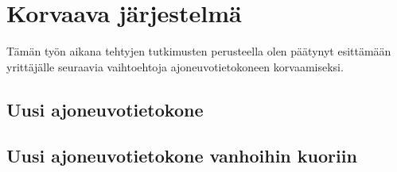 \chapter{Korvaava järjestelmä}
\label{ch:korvaava_jarjestelma}

Tämän työn aikana tehtyjen tutkimusten perusteella olen päätynyt esittämään yrittäjälle seuraavia vaihtoehtoja ajoneuvotietokoneen korvaamiseksi.

\section{Uusi ajoneuvotietokone}



\lipsum[1-3]



\section{Uusi ajoneuvotietokone vanhoihin kuoriin}

